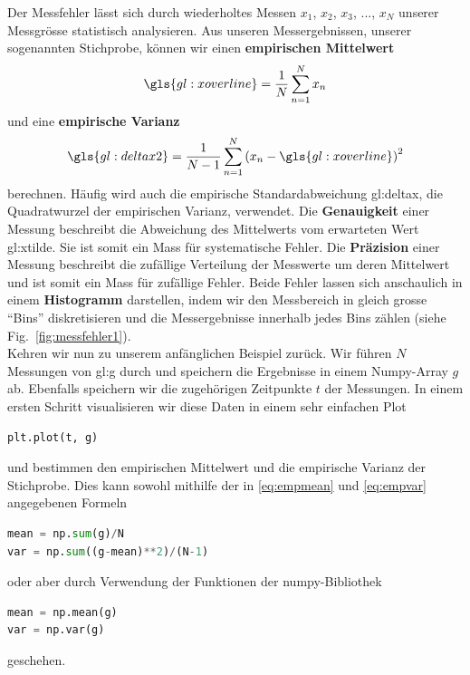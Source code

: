 Der Messfehler lässt sich durch wiederholtes Messen $x_1$, $x_2$, $x_3$, ..., $x_N$  unserer Messgrösse statistisch analysieren. Aus unseren Messergebnissen, unserer sogenannten Stichprobe, können wir einen  \textbf{empirischen Mittelwert}
\begin{align}
\gls{gl:xoverline} = \frac{1}{N} \sum^N_{n = 1} x_n
\label{eq:empmean}
\end{align}
und eine \textbf{empirische Varianz}
\begin{align}
\gls{gl:deltax2}  = \frac{1}{N-1} \sum^N_{n = 1} \left( x_n - \gls{gl:xoverline} \right) ^2
\label{eq:empvar}
\end{align}
berechnen. Häufig wird auch die empirische Standardabweichung \gls{gl:deltax}, die Quadratwurzel der empirischen Varianz, verwendet. Die \textbf{Genauigkeit} einer Messung beschreibt die Abweichung des Mittelwerts vom erwarteten Wert \gls{gl:xtilde}. Sie ist somit ein Mass für systematische Fehler. Die \textbf{Präzision} einer Messung beschreibt die zufällige Verteilung der Messwerte um deren Mittelwert und ist somit ein Mass für zufällige Fehler. Beide Fehler lassen sich anschaulich in einem \textbf{Histogramm} darstellen, indem wir den Messbereich in gleich grosse ``Bins'' diskretisieren und die Messergebnisse innerhalb jedes Bins zählen (siehe Fig.~\ref{fig:messfehler1}).  \\

Kehren wir nun zu unserem anfänglichen Beispiel zurück. Wir führen $N$ Messungen von \gls{gl:g} durch und speichern die Ergebnisse in einem Numpy-Array $g$ ab. Ebenfalls speichern wir die zugehörigen Zeitpunkte $t$ der Messungen. In einem ersten Schritt visualisieren wir diese Daten in einem sehr einfachen Plot
\begin{lstlisting}[language = Python]
plt.plot(t, g)
\end{lstlisting}
und bestimmen den empirischen Mittelwert und die empirische Varianz der Stichprobe. Dies kann sowohl mithilfe der in \ref{eq:empmean} und \ref{eq:empvar} angegebenen Formeln   
\begin{lstlisting}[language = Python]
mean = np.sum(g)/N
var = np.sum((g-mean)**2)/(N-1)
\end{lstlisting}
oder aber durch Verwendung der Funktionen der numpy-Bibliothek
\begin{lstlisting}[language = Python]
mean = np.mean(g)
var = np.var(g)
\end{lstlisting}
geschehen.\\

